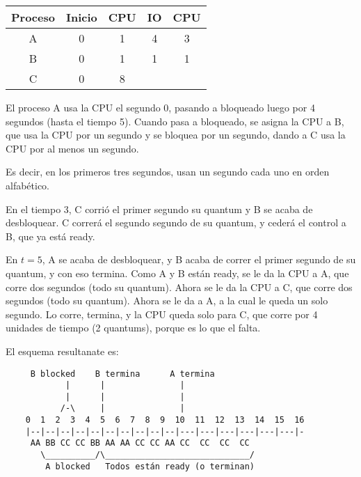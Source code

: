 \documentclass[12pt]{article}
\theoremstyle{definition}
\begin{document}
\begin{table}[h!]
\centering
\renewcommand{\arraystretch}{1.2}
\begin{tabular}{|c|c|c|c|c|}
\hline
\textbf{Proceso} & \textbf{Inicio} & \textbf{CPU} & \textbf{IO} & \textbf{CPU} \\ \hline
A & 0 & 1 & 4 & 3 \\ \hline
B & 0 & 1 & 1 & 1 \\ \hline
C & 0 & 8 &   &   \\ \hline
\end{tabular}
\end{table}

El proceso A usa la CPU el segundo 0, pasando a bloqueado luego por 4
segundos (hasta el tiempo 5). Cuando pasa a bloqueado, se asigna la CPU a B, que
usa la CPU por un segundo y se bloquea por un segundo, dando a C usa la CPU por al
menos un segundo.

Es decir, en los primeros tres segundos, usan un segundo cada uno en orden
alfabético.

En el tiempo 3, C corrió el primer segundo su quantum y B se acaba de
desbloquear. C correrá el segundo segundo de su quantum, y cederá el control a
B, que ya está ready. 

En $t = 5$, A se acaba de desbloquear, y B acaba de correr el primer segundo de
su quantum, y con eso termina. Como A y B están ready, se le da la CPU a A, 
que corre dos segundos (todo su quantum). Ahora se le da la CPU a C, que corre
dos segundos (todo su quantum). Ahora se le da a A, a la cual le queda un solo
segundo. Lo corre, termina, y la CPU queda solo para C, que corre por 4 unidades
de tiempo (2 quantums), porque es lo que el falta. \

El esquema resultanate es:

\begin{center}
\begin{verbatim}
     B blocked    B termina      A termina
            |      |               |
            |      |               |
           /-\     |               |
    0  1  2  3  4  5  6  7  8  9  10  11  12  13  14  15  16
    |--|--|--|--|--|--|--|--|--|--|---|---|---|---|---|---|-
     AA BB CC CC BB AA AA CC CC AA CC  CC  CC  CC
       \__________/\_____________________________/
        A blocked   Todos están ready (o terminan)
\end{verbatim}
\end{center}




\pagebreak 
\end{document}
